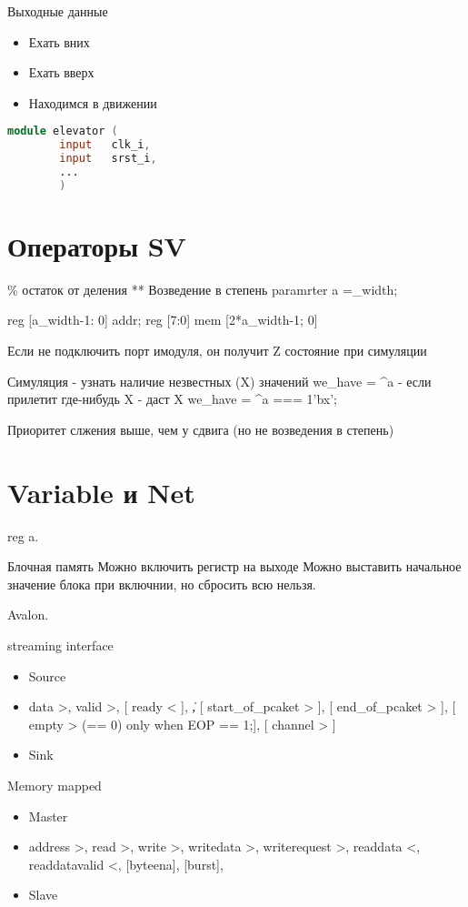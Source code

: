 \documentclass[a4paper, 12pt]{extarticle}
\begin{document}
		Выходные данные
		\begin{itemize}
			\item Ехать вних
			\item Ехать вверх
			\item Находимся в движении
		\end{itemize}

	\begin{lstlisting}[language=Verilog]
		module elevator (
		input	clk_i,
		input	srst_i,
		...
		)
	\end{lstlisting}


\section{Операторы SV}
	\% остаток от деления
	** Возведение  в степень
	paramrter a =_width;

	reg [a_width-1: 0] addr;
	reg [7:0] mem [2*a_width-1; 0]

	Если не подключить порт имодуля, он получит Z состояние при симуляции

	Симуляция - узнать наличие незвестных (X) значений
	we_have = ^a - если прилетит где-нибудь X -  даст X
	we_have = ^a === 1'bx';

	Приоритет слжения выше, чем у сдвига (но не возведения в степень)


\section{Variable и Net}
	reg a.

Блочная память
	Можно включить регистр на выходе
	Можно выставить начальное значение блока при включнии, но сбросить всю нельзя.



Avalon.

streaming interface
\begin{itemize}
	\item Source
	\item data >, valid >, [ ready < ], \|, [ start_of_pcaket > ], [ end_of_pcaket > ], [ empty > (== 0) only when EOP == 1;], [ channel > ]
	\item Sink
\end{itemize}

Memory mapped
\begin{itemize}
	\item Master
	\item address >, read >, write >, writedata >, writerequest >, readdata <, readdatavalid <, [byteena], [burst],
	\item Slave
\end{itemize}
\end{document}
